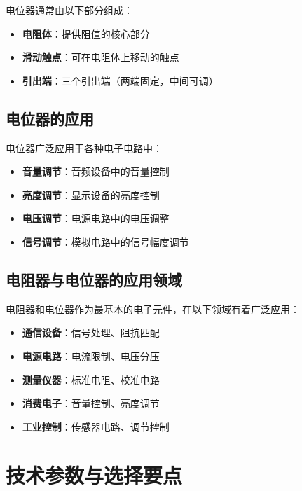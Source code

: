\documentclass[12pt,UTF8]{ctexbook}
\begin{document}

电位器通常由以下部分组成：

\begin{itemize}[leftmargin=2cm]
	\item \textbf{电阻体}：提供阻值的核心部分
	\item \textbf{滑动触点}：可在电阻体上移动的触点
	\item \textbf{引出端}：三个引出端（两端固定，中间可调）
\end{itemize}

\subsection{电位器的应用}

电位器广泛应用于各种电子电路中：

\begin{itemize}[leftmargin=2cm]
	\item \textbf{音量调节}：音频设备中的音量控制
	\item \textbf{亮度调节}：显示设备的亮度控制
	\item \textbf{电压调节}：电源电路中的电压调整
	\item \textbf{信号调节}：模拟电路中的信号幅度调节
\end{itemize}

\subsection{电阻器与电位器的应用领域}

电阻器和电位器作为最基本的电子元件，在以下领域有着广泛应用：

\begin{itemize}[leftmargin=2cm]
	\item \textbf{通信设备}：信号处理、阻抗匹配
	\item \textbf{电源电路}：电流限制、电压分压
	\item \textbf{测量仪器}：标准电阻、校准电路
	\item \textbf{消费电子}：音量控制、亮度调节
	\item \textbf{工业控制}：传感器电路、调节控制
\end{itemize}

\section{技术参数与选择要点}
\end{document}
